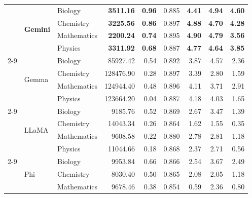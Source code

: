 \documentclass[a4paper,conference]{IEEEtran}
\begin{document}
\begin{table}[!t]
\begin{tabular}{|c|l|l|r|r|r|r|r|r|}
  & \multirow{4}{*}{\textbf{Gemini}} & Biology     & \textbf{3511.16} & \textbf{0.96} & 0.885 & \textbf{4.41} & \textbf{4.94} & \textbf{4.60} \\
  &                                   & Chemistry   & \textbf{3225.56} & \textbf{0.86} & 0.897 & \textbf{4.88} & \textbf{4.70} & \textbf{4.28} \\
  &                                   & Mathematics & \textbf{2200.24} & \textbf{0.74} & 0.895 & \textbf{4.90} & \textbf{4.79} & \textbf{3.56} \\
  &                                   & Physics     & \textbf{3311.92} & \textbf{0.68} & 0.887 & \textbf{4.77} & \textbf{4.64} & \textbf{3.85} \\ \cline{2-9}
  & \multirow{4}{*}{Gemma}           & Biology     & 85927.42         & 0.54          & 0.892 & 3.87          & 4.57 & 2.36 \\
  &                                   & Chemistry   &128476.90         & 0.28          & 0.897 & 3.39          & 2.80 & 1.59 \\
  &                                   & Mathematics &124944.40         & 0.48          & 0.896 & 4.11          & 3.71 & 2.91 \\
  &                                   & Physics     &123664.20         & 0.04          & 0.887 & 4.18          & 4.03 & 1.65 \\ \cline{2-9}
  & \multirow{4}{*}{LLaMA}           & Biology     &  9185.76         & 0.52          & 0.869 & 2.67          & 3.47 & 1.39 \\
  &                                   & Chemistry   & 14043.34         & 0.26          & 0.864 & 1.62          & 1.55 & 0.35 \\
  &                                   & Mathematics &  9608.58         & 0.22          & 0.880 & 2.78          & 2.81 & 1.18 \\
  &                                   & Physics     & 11044.66         & 0.18          & 0.868 & 2.37          & 2.71 & 0.56 \\ \cline{2-9}
  & \multirow{4}{*}{Phi}             & Biology     &  9953.84         & 0.66          & 0.866 & 2.54          & 3.67 & 2.49 \\
  &                                   & Chemistry   &  8030.40         & 0.50          & 0.865 & 2.08          & 2.05 & 1.18 \\
  &                                   & Mathematics &  9678.46         & 0.38          & 0.854 & 0.59          & 2.36 & 0.80 \\

\end{tabular}
\end{table}
\end{document}
